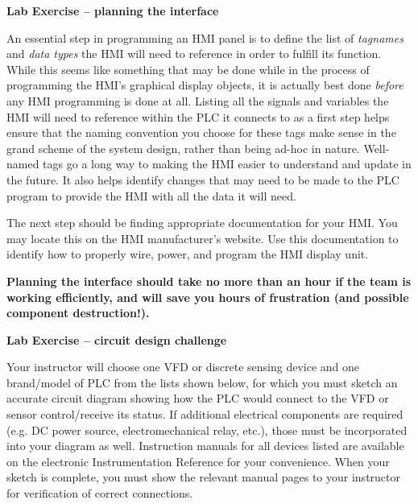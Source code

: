 \begin{itemize}
\vfil \eject

\noindent
{\bf Lab Exercise -- planning the interface}

\vskip 5pt

An essential step in programming an HMI panel is to define the list of {\it tagnames} and {\it data types} the HMI will need to reference in order to fulfill its function.  While this seems like something that may be done while in the process of programming the HMI's graphical display objects, it is actually best done {\it before} any HMI programming is done at all.  Listing all the signals and variables the HMI will need to reference within the PLC it connects to as a first step helps ensure that the naming convention you choose for these tags make sense in the grand scheme of the system design, rather than being ad-hoc in nature.  Well-named tags go a long way to making the HMI easier to understand and update in the future.  It also helps identify changes that may need to be made to the PLC program to provide the HMI with all the data it will need.

\vskip 10pt

The next step should be finding appropriate documentation for your HMI.  You may locate this on the HMI manufacturer's website.  Use this documentation to identify how to properly wire, power, and program the HMI display unit.

\vskip 10pt

{\bf Planning the interface should take no more than an hour if the team is working efficiently, and will save you hours of frustration (and possible component destruction!).}






\vfil \eject

\noindent
{\bf Lab Exercise -- circuit design challenge}

\vskip 5pt

Your instructor will choose one VFD or discrete sensing device and one brand/model of PLC from the lists shown below, for which you must sketch an accurate circuit diagram showing how the PLC would connect to the VFD or sensor control/receive its status.  If additional electrical components are required (e.g. DC power source, electromechanical relay, etc.), those must be incorporated into your diagram as well.  Instruction manuals for all devices listed are available on the electronic Instrumentation Reference for your convenience.  When your sketch is complete, you must show the relevant manual pages to your instructor for verification of correct connections.


\end{itemize}
